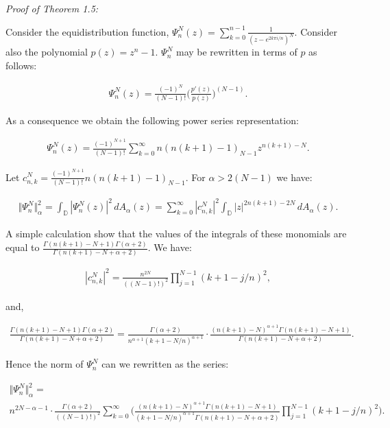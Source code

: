\documentclass{amsart}[11pt]
\newcommand{\D}{\mathbb{D}} %
\renewcommand{\it}[1]{\textit{#1}}
\theoremstyle{definition}
\begin{document}
\it{Proof of Theorem 1.5:}

Consider the equidistribution function, $\Psi_n^N(z) = \sum_{k=0}^{n-1} \frac{1}{(z-e^{2  k\pi i /n })^N}$. Consider also the polynomial $p(z) = z^n -1$. $\Psi_n^N$ may be rewritten in terms of $p$ as follows:

\begin{gather*}
    \Psi_n^N(z) = \frac{(-1)^N}{(N-1)!} \bigg( \frac{p'(z)}{p(z)}\bigg)^{(N-1)}.
\end{gather*}

As a consequence we obtain the following power series representation:

\begin{gather*}
    \Psi_n^N(z) = \frac{(-1)^{N+1}}{(N-1)!} \sum_{k=0}^{\infty} n (n(k+1)-1)_{N-1}z^{n(k+1)-N}.
\end{gather*}

Let $c_{n,k}^N = \frac{(-1)^{N+1}}{(N-1)!}  n (n(k+1)-1)_{N-1}$. For $\alpha > 2(N-1)$ we have:

\begin{gather*}
    \Vert \Psi_n^N \Vert_{\alpha}^2 = \int_{\D}|\Psi_n^N(z)|^2 \, dA_{\alpha}(z) = \sum_{k=0}^{\infty} |c_{n,k}^N|^2 \int_{\D}|z|^{2n(k+1) - 2N} \,dA_{\alpha}(z) .
\end{gather*}

A simple calculation show that the values of the integrals of these monomials are equal to $\frac{\Gamma(n(k+1)-N+1) \Gamma(\alpha+2)}{\Gamma(n(k+1)-N + \alpha + 2 )}$. We have:

\begin{gather*}
    |c_{n,k}^N|^2  = \frac{n^{2N}}{((N-1)!)^2} \prod_{j=1}^{N-1}(k+1 - j/n)^2,
\end{gather*}    

and,

\begin{gather*}
    \frac{\Gamma(n(k+1)-N+1) \Gamma(\alpha+2)}{\Gamma(n(k+1)-N + \alpha + 2 )} = \frac{\Gamma(\alpha + 2)}{n^{\alpha + 1} (k+1 - N/n)^{\alpha + 1}} \cdot  \frac{(n(k+1)-N)^{\alpha + 1} \Gamma(n(k+1)-N+1)}{\Gamma(n(k+1)-N + \alpha + 2)}.
\end{gather*}

Hence the norm of $\Psi_n^N$ can we rewritten as the series:

\begin{gather*}
     \Vert \Psi_n^N \Vert_{\alpha}^2 =  \\ 
     n^{2N-\alpha -1}\cdot \frac{\Gamma(\alpha+2)}{((N-1)!)^2} \sum_{k=0}^{\infty}\bigg( \frac{(n(k+1)-N)^{\alpha + 1} \Gamma(n(k+1)-N+1)}{(k+1-N/n)^{\alpha+1}\Gamma(n(k+1)-N + \alpha + 2)}\prod_{j=1}^{N-1}(k+1 - j/n)^2  \bigg) .
\end{gather*}
\end{document}
